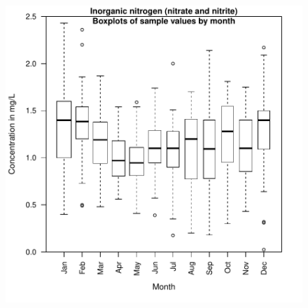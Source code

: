 \documentclass[a4paper,11pt]{article}
\begin{document}
\begin{figure}[htbp]
  \begin{minipage}[h]{0.5\linewidth}
    \begin{center}

\includegraphics{EGRET-figboxConcMonth}
    \label{fig:boxConcMonth}
    \end{center}
  \end{minipage}
  \hspace{0.5cm}
  \begin{minipage}[h]{0.5\linewidth}
    \begin{center}



\end{center}
\end{minipage}
\end{figure}
\end{document}
